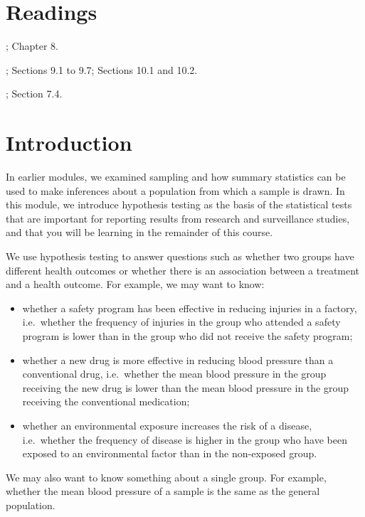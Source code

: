 \documentclass[
]{memoir}
\providecommand{\tightlist}{%
  \setlength{\itemsep}{0pt}\setlength{\parskip}{0pt}}
\begin{document}
\hypertarget{readings-3}{%
\section*{Readings}\label{readings-3}}

\citet{kirkwood_sterne01}; Chapter 8.

\citet{bland15}; Sections 9.1 to 9.7; Sections 10.1 and 10.2.

\citet{acock10}; Section 7.4.

\hypertarget{introduction-3}{%
\section{Introduction}\label{introduction-3}}

In earlier modules, we examined sampling and how summary statistics can be used to make inferences about a population from which a sample is drawn. In this module, we introduce hypothesis testing as the basis of the statistical tests that are important for reporting results from research and surveillance studies, and that you will be learning in the remainder of this course.

We use hypothesis testing to answer questions such as whether two groups have different health outcomes or whether there is an association between a treatment and a health outcome. For example, we may want to know:

\begin{itemize}
\tightlist
\item
  whether a safety program has been effective in reducing injuries in a factory, i.e.~whether the frequency of injuries in the group who attended a safety program is lower than in the group who did not receive the safety program;
\item
  whether a new drug is more effective in reducing blood pressure than a conventional drug, i.e.~whether the mean blood pressure in the group receiving the new drug is lower than the mean blood pressure in the group receiving the conventional medication;
\item
  whether an environmental exposure increases the risk of a disease, i.e.~whether the frequency of disease is higher in the group who have been exposed to an environmental factor than in the non-exposed group.
\end{itemize}

We may also want to know something about a single group. For example, whether the mean blood pressure of a sample is the same as the general population.
\end{document}
